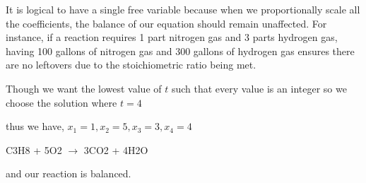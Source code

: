 \documentclass{article}
\begin{document}
It is logical to have a single free variable because when we proportionally scale all the coefficients, the balance of our equation should remain unaffected. For instance, if a reaction requires 1 part nitrogen gas and 3 parts hydrogen gas, having 100 gallons of nitrogen gas and 300 gallons of hydrogen gas ensures there are no leftovers due to the stoichiometric ratio being met.

Though we want the lowest value of $t$ such that every value is an integer so we choose the solution where $t=4$

thus we have, $x_1 = 1, x_2=5, x_3=3,x_4=4$

\begin{center}
    C3H8 + 5O2 $\xrightarrow{}$ 3CO2 + 4H2O \\
\end{center}

and our reaction is balanced.
\end{document}
